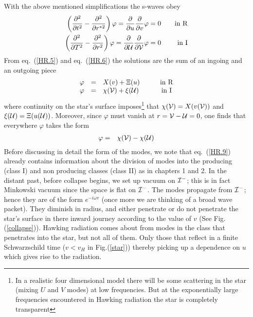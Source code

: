 \documentclass[12pt,oneside]{report}
\begin{document}
With the above mentioned simplifications the s-waves 
obey
 \begin {eqnarray}
\left( {\partial ^2 \over \partial t^2} - {\partial ^2 \over \partial r
^{*2}} \right) \varphi =
{\partial  \over \partial u}{\partial  \over \partial v}\varphi
=0 &\quad& {\rm in\ R}
\label {HR.5} \\
\left( {\partial ^2 \over \partial T^2} - {\partial ^2 \over \partial
r ^{2}} \right) \varphi = {\partial  \over \partial  {\cal{U}} }
{\partial  \over \partial  {\cal{V}} }\varphi
=0 &\quad& {\rm in\ I}
\label {HR.6} 
\end {eqnarray} 
\noindent From eq.~(\ref {HR.5})  and eq.~(\ref {HR.6}) the solutions are the sum of an
ingoing and an outgoing piece
\begin{equation}
\begin {array}{cclcc}
\varphi& =& X(v) + \Xi(u) &\quad& {\rm in\ R}
\label{HR.7}\\
\varphi &=& \chi( {\cal{V}} ) + \xi( {\cal{U}} ) &\quad& {\rm in\ I}
\label{HR.8}
\end{array}
\end{equation}
where continuity on the star's surface 
imposes\footnote{In a realistic four dimensional model there will be some
scattering in the star (mixing $U$ and $V$ modes) at low frequencies.
But at the exponentially large frequencies encountered in Hawking radiation
the star is completely transparent} that $\chi( {\cal{V}} ) = X(v( {\cal{V}} ))$
and $\xi( {\cal{U}} ) = \Xi(u( {\cal{U}} ))$. 
Moreover, since $\varphi$
must vanish at ${r={\cal{V}}-{\cal{U}}=0}$,
one finds
that everywhere $\varphi$ takes the form
\begin {eqnarray}
\varphi &=& \chi( {\cal{V}} ) - \chi( {\cal{U}} ) 
\label{HR.9}
\end{eqnarray}
Before discussing in detail the form of the modes, 
we note that 
eq.~(\ref {HR.9}) 
already contains information about the division of modes into
the producing (class I) and non producing classes (class II)
as in chapters 1 and 2. In the distant
past, before collapse begins, we 
set up vacuum on  ${\cal I}^-$; this is in fact
Minkowski vacuum since the space is flat on  ${\cal I}^-$. The modes propagate
from  ${\cal I}^-$; hence they are 
of the form $e^{-i \omega v}$ (once more we are
thinking of a broad wave packet). They diminish 
in radius, and either penetrate or
do not penetrate the star's surface in there inward journey according to the
value of $v$ (See Fig.(\ref{collapse})). Hawking 
radiation comes about from modes in
the class that penetrates into the star, but not 
all of them. Only those that reflect
in a finite Schwarzschild time  ($v<v_H$ in Fig.(\ref{star})) 
thereby picking up a
dependence on $u$ which gives rise to the radiation. 
\end{document}
